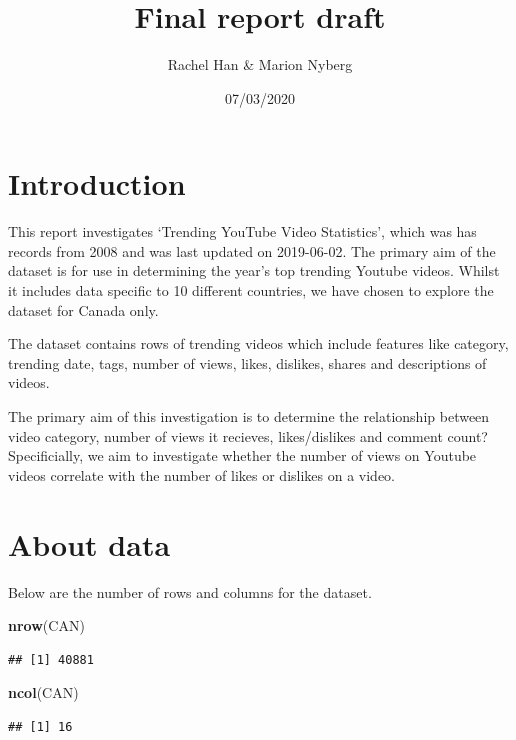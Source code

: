 \documentclass[]{article}
\title{Final report draft}
\author{Rachel Han \& Marion Nyberg}
\date{07/03/2020}
\newenvironment{Shaded}{\begin{snugshade}}{\end{snugshade}}
\newcommand{\KeywordTok}[1]{\textcolor[rgb]{0.13,0.29,0.53}{\textbf{#1}}}
\newcommand{\NormalTok}[1]{#1}
\begin{document}
\maketitle

\hypertarget{introduction}{%
\section{Introduction}\label{introduction}}

This report investigates `Trending YouTube Video Statistics', which was
has records from 2008 and was last updated on 2019-06-02. The primary
aim of the dataset is for use in determining the year's top trending
Youtube videos. Whilst it includes data specific to 10 different
countries, we have chosen to explore the dataset for Canada only.

The dataset contains rows of trending videos which include features like
category, trending date, tags, number of views, likes, dislikes, shares
and descriptions of videos.

The primary aim of this investigation is to determine the relationship
between video category, number of views it recieves, likes/dislikes and
comment count? Specificially, we aim to investigate whether the number
of views on Youtube videos correlate with the number of likes or
dislikes on a video.

\hypertarget{about-data}{%
\section{About data}\label{about-data}}

Below are the number of rows and columns for the dataset.

\begin{Shaded}
\begin{Highlighting}[]
\KeywordTok{nrow}\NormalTok{(CAN) }
\end{Highlighting}
\end{Shaded}

\begin{verbatim}
## [1] 40881
\end{verbatim}

\begin{Shaded}
\begin{Highlighting}[]
\KeywordTok{ncol}\NormalTok{(CAN)}
\end{Highlighting}
\end{Shaded}

\begin{verbatim}
## [1] 16
\end{verbatim}
\end{document}
